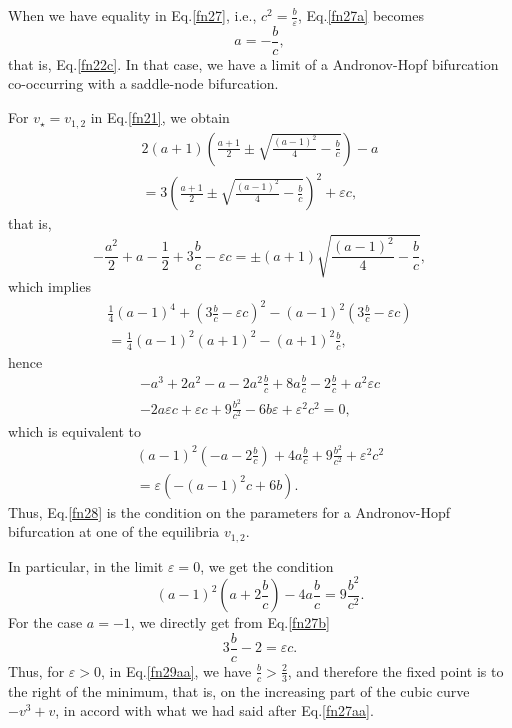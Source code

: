 When we have equality in Eq.\eqref{fn27}, i.e., $c^2
=\frac{b}{\varepsilon}$, Eq.\eqref{fn27a} becomes \begin{equation}\label{fn27b}
a=-\frac{b}{c}, \end{equation} that is, Eq.\eqref{fn22c}. In that case, we have a
limit of a Andronov-Hopf bifurcation co-occurring with a
saddle-node bifurcation.

For $v_\star =v_{1,2}$ in Eq.\eqref{fn21}, we obtain 
\begin{eqnarray}\label{fn27b}\nonumber
2(a+1)\left(\frac{a+1}{2}\pm
\sqrt{\frac{(a-1)^2}{4} -\frac{b}{c}}\right)-a\\
=3\left(\frac{a+1}{2}\pm \sqrt{\frac{(a-1)^2}{4}
-\frac{b}{c}}\right)^2+\varepsilon c, 
\end{eqnarray}
 that is,
$$
 -\frac{a^2}{2} +a -\frac{1}{2} +3\frac{b}{c}-\varepsilon c=\pm (a+1)\sqrt{\frac{(a-1)^2}{4}-\frac{b}{c}},$$
which implies
\begin{eqnarray}\nonumber
\frac{1}{4}(a-1)^4 +(3\frac{b}{c} -\varepsilon c)^2 -(a-1)^2(3\frac{b}{c} -\varepsilon c)
\\=\frac{1}{4}(a-1)^2(a+1)^2 -(a+1)^2\frac{b}{c}\nonumber,
\end{eqnarray}
hence
\begin{eqnarray}\nonumber
-a^3+2a^2-a   -2a^2\frac{b}{c}+8a\frac{b}{c}-2\frac{b}{c} +a^2 \varepsilon c \\-2a\varepsilon c
+\varepsilon c +9\frac{b^2}{c^2} -6b\varepsilon +\varepsilon^2 c^2=0,\nonumber
\end{eqnarray}
which is equivalent to 
\begin{eqnarray}\label{fn28}\nonumber
(a-1)^2(-a
-2\frac{b}{c})+4a\frac{b}{c} +9\frac{b^2}{c^2}+\varepsilon^2 c^2\\=\varepsilon
(-(a-1)^2 c +6b).
\end{eqnarray}
Thus, Eq.\eqref{fn28} is the
condition on the parameters for a Andronov-Hopf bifurcation at one
of the equilibria $v_{1,2}$.

In particular, in the limit $\varepsilon =0$, we get the condition
\begin{equation}\label{fn29} (a-1)^2(a +2\frac{b}{c})-4a\frac{b}{c}
=9\frac{b^2}{c^2}. \end{equation} For the case $a=-1$, we directly get from
Eq.\eqref{fn27b} \begin{equation}\label{fn29aa} 3\frac{b}{c}-2=\varepsilon c. \end{equation} Thus,
for $\varepsilon >0$, in Eq.\eqref{fn29aa}, we have $\frac{b}{c}
>\frac{2}{3}$, and therefore the fixed point is to the right of the
minimum, that is, on the increasing part of the cubic curve
$-v^3+v$, in accord with what we had said after Eq.\eqref{fn27aa}.

